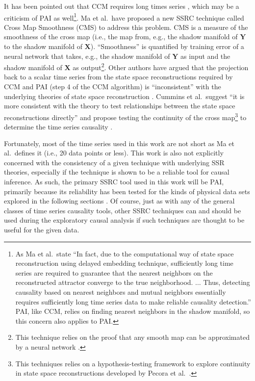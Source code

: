 It has been pointed out that CCM requires long times series \cite{Ma2014}, which may be a criticism of PAI as well\footnote{As Ma et al.\ state ``In fact, due to the computational way of state space reconstruction using delayed embedding technique, sufficiently long time series are required to guarantee that the nearest neighbors on the reconstructed attractor converge to the true neighborhood. $\ldots$  Thus, detecting causality based on nearest neighbors and mutual neighbors essentially requires sufficiently long time series data to make reliable causality detection.''  PAI, like CCM, relies on finding nearest neighbors in the shadow manifold, so this concern also applies to PAI.}.  Ma et al.\ have proposed a new SSRC technique called Cross Map Smoothness (CMS) to address this problem.  CMS is a measure of the smoothness of the cross map (i.e., the map from, e.g., the shadow manifold of $\mathbf{Y}$ to the shadow manifold of $\mathbf{X}$).  ``Smoothness'' is quantified by training error of a neural network that takes, e.g., the shadow manifold of $\mathbf{Y}$ as input and the shadow manifold of $\mathbf{X}$ as output\footnote{This technique relies on the proof that any smooth map can be approximated by a neural network \cite{Park1991}.}.  Other authors have argued that the projection back to a scalar time series from the state space reconstructions required by CCM and PAI (step 4 of the CCM algorithm) is ``inconsistent'' with the underlying theories of state space reconstruction \cite{Cummins2015}.  Cummins et al.\ suggest ``it is more consistent with the theory to test relationships between the state space reconstructions directly'' and propose testing the continuity of the cross map\footnote{This techniques relies on a hypothesis-testing framework to explore continuity in state space reconstructions developed by Pecora et al.\ \cite{Pecora1995}.} to determine the time series causality \cite{Cummins2015}.  

Fortunately, most of the time series used in this work are not short as Ma et al.\ defines it (i.e., 20 data points or less).  This work is also not explicitly concerned with the  consistency of a given technique with underlying SSR theories, especially if the technique is shown to be a reliable tool for causal inference.  As such, the primary SSRC tool used in this work will be PAI, primarily because its reliability has been tested for the kinds of physical data sets explored in the following sections \cite{Weigel2014}.  Of course, just as with any of the general classes of time series causality tools, other SSRC techniques can and should be used during the exploratory causal analysis if such techniques are thought to be useful for the given data.

